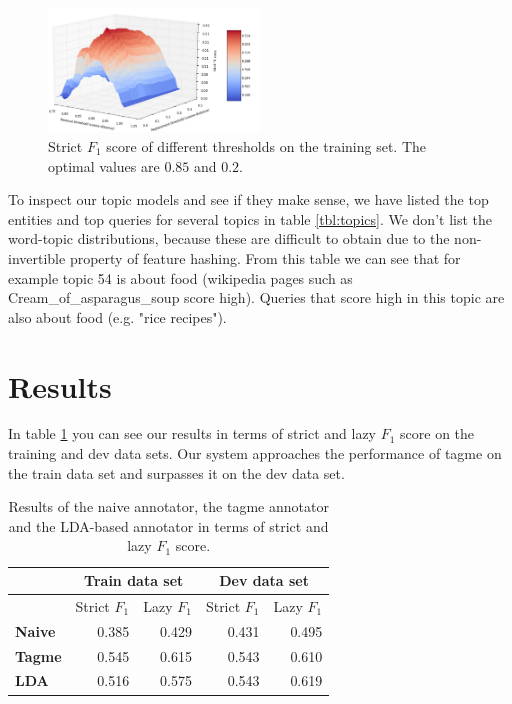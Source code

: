 \documentclass[a4paper,10pt,twocolumn]{article}
\begin{document}
\begin{figure}[H]
\centering
\includegraphics[width=0.5\textwidth]{gridsearch.png}
\caption{Strict $F_1$ score of different thresholds on the training set. The optimal values are $0.85$ and $0.2$.}
\label{fig:gridsearch}
\end{figure}

To inspect our topic models and see if they make sense, we have listed the top entities and top queries for several topics in table \ref{tbl:topics}. We don't list the word-topic distributions, because these are difficult to obtain due to the non-invertible property of feature hashing. From this table we can see that for example topic 54 is about food (wikipedia pages such as Cream\_of\_asparagus\_soup score high). Queries that score high in this topic are also about food (e.g. "rice recipes").

\section{Results}
In table \ref{tbl:results} you can see our results in terms of strict and lazy $F_1$ score on the training and dev data sets. Our system approaches the performance of tagme on the train data set and surpasses it on the dev data set.



\begin{table}[H]
\centering
\begin{tabular}{|l|r|r|r|r|}
\hline
 &  \multicolumn{2}{c|}{\textbf{Train data set}} & \multicolumn{2}{c|}{\textbf{Dev data set}} \\
\hline
 & Strict $F_1$ & Lazy $F_1$ & Strict $F_1$ & Lazy $F_1$ \\
\hline
\textbf{Naive} & 0.385 & 0.429 & 0.431 & 0.495 \\
\textbf{Tagme} & 0.545 & 0.615 & 0.543 & 0.610 \\
\textbf{LDA} & 0.516 & 0.575 & 0.543 & 0.619 \\
\hline
\end{tabular}
\caption{Results of the naive annotator, the tagme annotator and the LDA-based annotator in terms of strict and lazy $F_1$ score.}
\label{tbl:results}
\end{table}
\end{document}
